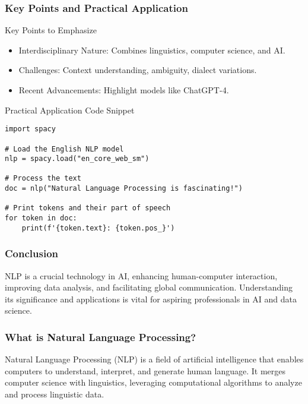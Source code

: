 \documentclass[aspectratio=169]{beamer}
\begin{document}
\begin{frame}[fragile]
    \frametitle{Key Points and Practical Application}

    \begin{block}{Key Points to Emphasize}
        \begin{itemize}
            \item Interdisciplinary Nature: Combines linguistics, computer science, and AI.
            \item Challenges: Context understanding, ambiguity, dialect variations.
            \item Recent Advancements: Highlight models like ChatGPT-4.
        \end{itemize}
    \end{block}

    \begin{block}{Practical Application Code Snippet}
        \begin{lstlisting}
import spacy

# Load the English NLP model
nlp = spacy.load("en_core_web_sm")

# Process the text
doc = nlp("Natural Language Processing is fascinating!")

# Print tokens and their part of speech
for token in doc:
    print(f'{token.text}: {token.pos_}')
        \end{lstlisting}
    \end{block}
\end{frame}

\begin{frame}[fragile]
    \frametitle{Conclusion}
    
    NLP is a crucial technology in AI, enhancing human-computer interaction, improving data analysis, and facilitating global communication. Understanding its significance and applications is vital for aspiring professionals in AI and data science.
\end{frame}

\begin{frame}[fragile]
    \frametitle{What is Natural Language Processing?}
    
    Natural Language Processing (NLP) is a field of artificial intelligence that enables computers to understand, interpret, and generate human language. It merges computer science with linguistics, leveraging computational algorithms to analyze and process linguistic data.
\end{frame}
\end{document}
